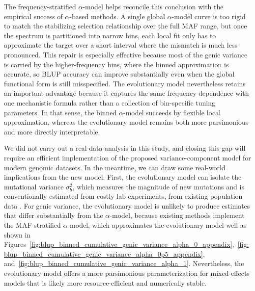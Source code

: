 \documentclass[10pt]{article}
\begin{document}
The frequency-stratified $\alpha$-model helps reconcile this conclusion with the empirical success of $\alpha$-based methods. 
A single global $\alpha$-model curve is too rigid to match the stabilizing selection relationship over the full MAF range, 
but once the spectrum is partitioned into narrow bins, 
each local fit only has to approximate the target over a short interval where the mismatch is much less pronounced. 
This repair is especially effective because most of the genic variance is carried by the higher-frequency bins, 
where the binned approximation is accurate,
so BLUP accuracy can improve substantially even when the global functional form is still misspecified. 
The evolutionary model nevertheless retains an important advantage because it captures the same frequency dependence with one mechanistic formula rather than a collection of bin-specific tuning parameters. 
In that sense, the binned $\alpha$-model succeeds by flexible local approximation, 
whereas the evolutionary model remains both more parsimonious and more directly interpretable.

We did not carry out a real-data analysis in this study, and closing this gap will require an efficient implementation of the proposed variance-component model for modern genomic datasets.
In the meantime, we can draw some real-world implications from the new model.
First, the evolutionary model can isolate the mutational variance $\sigma_b^2$, which measures the magnitude of new mutations and is conventionally estimated from costly lab experiments, from existing population data \citep{lynch1998geneticsandanalysisof,Lee2026}.
For genic variance, the evolutionary model is unlikely to produce estimates that differ substantially from the $\alpha$-model, because existing methods implement the MAF-stratified $\alpha$-model, which approximates the evolutionary model well as shown in Figures~\ref{fig:blup_binned_cumulative_genic_variance_alpha_0_appendix},~\ref{fig:blup_binned_cumulative_genic_variance_alpha_0p5_appendix}, and~\ref{fig:blup_binned_cumulative_genic_variance_alpha_1}.
Nevertheless, the evolutionary model offers a more parsimonious parameterization for mixed-effects models that is likely more resource-efficient and numerically stable.
\end{document}
